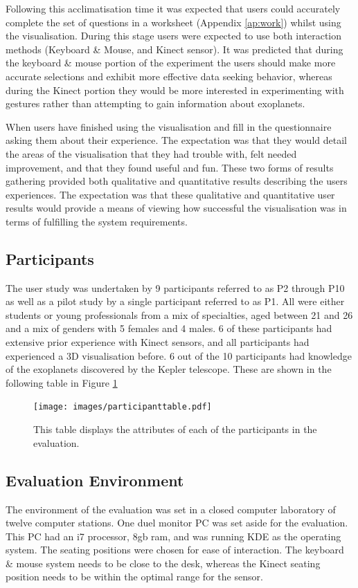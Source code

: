 Following this acclimatisation time it was expected that users could accurately
complete the set of questions in a worksheet (Appendix \ref{ap:work}) whilst using
the visualisation. During this stage users were expected to use both interaction
methods (Keyboard \& Mouse, and Kinect sensor). It was predicted that during the
keyboard \& mouse
portion of the experiment the users should make more accurate selections and
exhibit more effective data seeking behavior, whereas during the Kinect portion
they would be more interested in experimenting with gestures rather than
attempting to gain information about exoplanets.

When users have finished using the visualisation and fill in the questionnaire
asking them about their experience. The expectation was that
they would detail the areas of the visualisation that they had trouble with,
felt needed improvement, and that they found useful and fun. These two forms of
results gathering provided both qualitative and quantitative results describing
the
users experiences.
The expectation was that these qualitative and quantitative user results would
provide a means of viewing how successful the visualisation was in terms of
fulfilling the system requirements.

\subsection{Participants}
The user study was undertaken by 9 participants referred to as P2 through P10 as
well
as  
a pilot study by a single participant referred to as P1. All were either
students
or
young professionals from a mix of specialties, aged between 21 and 26 and a
mix
of genders with 5 females and 4 males. 6 of these participants had extensive
prior experience with Kinect sensors, and all participants had experienced a 3D
visualisation before. 6 out of the 10 participants had knowledge of the
exoplanets discovered by the Kepler telescope. These are shown in the following
table in Figure \ref{fig:participanttable}
\begin{figure}[H]
  \centering
      \texttt{[image: images/participanttable.pdf]}
  \caption[Summary of participants]{This table displays the attributes of each
of the participants in the evaluation.}  
    \label{fig:participanttable}
\end{figure}

\subsection{Evaluation Environment}
The environment of the evaluation was set in a closed computer laboratory of
twelve computer stations. One duel monitor PC was set aside for the evaluation.
This PC had an i7 processor, 8gb ram, and was running KDE \cite{kde} as the
operating system. The seating positions were chosen for ease of interaction. The keyboard \& mouse system needs to be close to the desk, whereas the Kinect seating position needs to be within the 
optimal range for the sensor.

